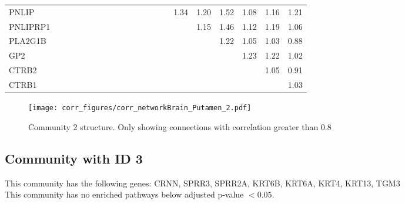 \begin{longtable}{lrrrrrrrrrrrrrrrrrrrr}
PNLIP    &              &              &              &             &             &             &            &              &            &            &            &             &           &             &           1.34 &          1.20 &      1.52 &        1.08 &        1.16 &       1.21 \\
PNLIPRP1 &              &              &              &             &             &             &            &              &            &            &            &             &           &             &                &          1.15 &      1.46 &        1.12 &        1.19 &       1.06 \\
PLA2G1B  &              &              &              &             &             &             &            &              &            &            &            &             &           &             &                &               &      1.22 &        1.05 &        1.03 &       0.88 \\
GP2      &              &              &              &             &             &             &            &              &            &            &            &             &           &             &                &               &           &        1.23 &        1.22 &       1.02 \\
CTRB2    &              &              &              &             &             &             &            &              &            &            &            &             &           &             &                &               &           &             &        1.05 &       0.91 \\
CTRB1    &              &              &              &             &             &             &            &              &            &            &            &             &           &             &                &               &           &             &             &       1.03 \\
\end{longtable}


\begin{figure}[h!]
\centering
\texttt{[image: corr\_figures/corr\_networkBrain\_Putamen\_2.pdf]}
\caption{Community 2 structure. Only showing connections with correlation greater than 0.8}
\end{figure}




\subsection*{Community with ID 3}
This community has the following genes: CRNN, SPRR3, SPRR2A, KRT6B, KRT6A, KRT4, KRT13, TGM3
\\
This community has no enriched pathways below adjusted p-value $< 0.05$.


